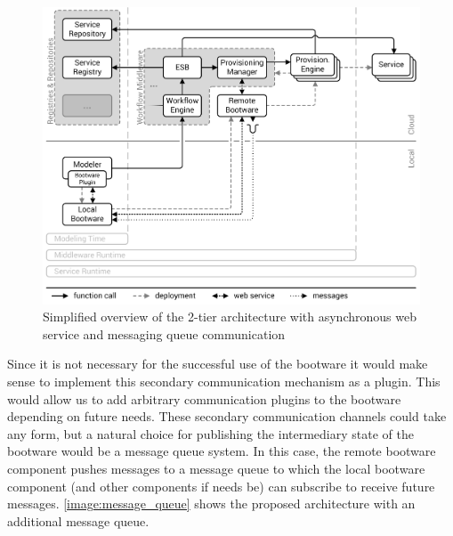 \begin{figure}[!htbp]
	\centering
	\includegraphics[resolution=600]{design/assets/message_queue}
	\caption{Simplified overview of the 2-tier architecture with asynchronous web service and messaging queue communication}
	\label{image:message_queue}
\end{figure}

Since it is not necessary for the successful use of the bootware it would make sense to implement this secondary communication mechanism as a plugin.
This would allow us to add arbitrary communication plugins to the bootware depending on future needs.
These secondary communication channels could take any form, but a natural choice for publishing the intermediary state of the bootware would be a message queue system.
In this case, the remote bootware component pushes messages to a message queue to which the local bootware component (and other components if needs be) can subscribe to receive future messages.
\autoref{image:message_queue} shows the proposed architecture with an additional message queue.
